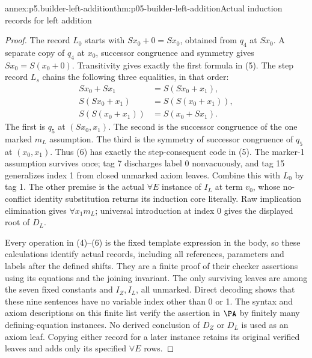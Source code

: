 \begin{annexitem}{annex:p5.builder-left-addition}{thm:p05-builder-left-addition}{Actual induction records for left addition}
\begin{proof}
The record \(L_0\) starts with \(Sx_0+0=Sx_0\), obtained from
\(q_4\) at \(Sx_0\). A separate copy of \(q_4\) at \(x_0\),
successor congruence and symmetry gives \(Sx_0=S(x_0+0)\).
Transitivity gives exactly the first formula in (5). The step record
\(L_s\) chains the following three equalities, in that order:
\[
\begin{aligned}
 Sx_0+Sx_1&=S(Sx_0+x_1),\\
 S(Sx_0+x_1)&=S(S(x_0+x_1)),\\
 S(S(x_0+x_1))&=S(x_0+Sx_1).
\end{aligned}
\tag{6}
\]
The first is \(q_5\) at \((Sx_0,x_1)\). The second is the successor
congruence of the one marked \(m_L\) assumption. The third is the
symmetry of successor congruence of \(q_5\) at \((x_0,x_1)\).
Thus (6) has exactly the step-consequent code in (5). The marker-1
assumption survives once; tag 7 discharges label 0 nonvacuously, and tag 15
generalizes index 1 from closed unmarked axiom leaves. Combine this with
\(L_0\) by tag 1. The other premise is the actual \(\forall E\)
instance of \(I_L\) at term \(v_0\), whose no-conflict identity substitution
returns its induction core literally. Raw implication elimination gives
\(\forall x_1 m_L\); universal introduction at index 0 gives the displayed
root of \(D_L\).

Every operation in (4)--(6) is the fixed template expression in the body,
so these calculations identify actual records, including all references,
parameters and labels after the defined shifts. They are a finite proof
of their checker assertions using its equations and the joining invariant.
The only surviving leaves are among the seven fixed constants and
\(I_Z,I_L\), all unmarked. Direct decoding shows that these nine sentences
have no variable index other than 0 or 1. The syntax and axiom descriptions
on this finite list verify the assertion in \(\PA\) by finitely many
defining-equation instances. No derived conclusion of \(D_Z\) or \(D_L\)
is used as an axiom leaf. Copying either record for a later instance retains
its original verified leaves and adds only its specified \(\forall E\) rows.
\end{proof}
\end{annexitem}

